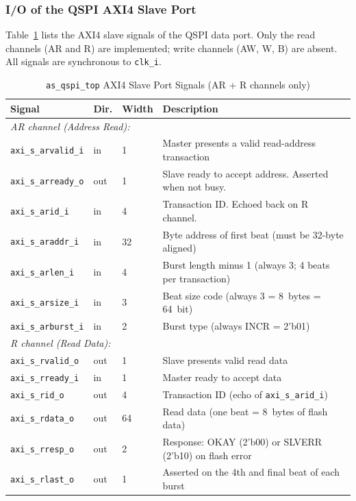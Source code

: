 \subsubsection{I/O of the QSPI AXI4 Slave Port}
\label{subsec:qspiAxi4Port}

Table~\ref{tab:asQspiAxi4} lists the AXI4 slave signals of the QSPI data port.
Only the read channels (AR and R) are implemented; write channels (AW, W, B) are absent.
All signals are synchronous to \texttt{clk\_i}.

\begin{table}[H]
\caption{\texttt{as\_qspi\_top} AXI4 Slave Port Signals (AR + R channels only)}
\label{tab:asQspiAxi4}
\centering
\begin{tabularx}{\textwidth}{|l|l|l|X|}
  \hline
  Signal & Dir. & Width & Description \\
  \hline\hline
  \multicolumn{4}{|l|}{\textit{AR channel (Address Read):}} \\
  \hline
  \texttt{axi\_s\_arvalid\_i} & in  & 1  & Master presents a valid read-address transaction \\
  \hline
  \texttt{axi\_s\_arready\_o} & out & 1  & Slave ready to accept address. Asserted when not busy. \\
  \hline
  \texttt{axi\_s\_arid\_i}    & in  & 4  & Transaction ID. Echoed back on R channel. \\
  \hline
  \texttt{axi\_s\_araddr\_i}  & in  & 32 & Byte address of first beat (must be 32-byte aligned) \\
  \hline
  \texttt{axi\_s\_arlen\_i}   & in  & 4  & Burst length minus 1 (always 3; 4 beats per transaction) \\
  \hline
  \texttt{axi\_s\_arsize\_i}  & in  & 3  & Beat size code (always 3 = 8~bytes = 64~bit) \\
  \hline
  \texttt{axi\_s\_arburst\_i} & in  & 2  & Burst type (always INCR = 2'b01) \\
  \hline
  \multicolumn{4}{|l|}{\textit{R channel (Read Data):}} \\
  \hline
  \texttt{axi\_s\_rvalid\_o}  & out & 1  & Slave presents valid read data \\
  \hline
  \texttt{axi\_s\_rready\_i}  & in  & 1  & Master ready to accept data \\
  \hline
  \texttt{axi\_s\_rid\_o}     & out & 4  & Transaction ID (echo of \texttt{axi\_s\_arid\_i}) \\
  \hline
  \texttt{axi\_s\_rdata\_o}   & out & 64 & Read data (one beat = 8~bytes of flash data) \\
  \hline
  \texttt{axi\_s\_rresp\_o}   & out & 2  & Response: OKAY (2'b00) or SLVERR (2'b10) on flash error \\
  \hline
  \texttt{axi\_s\_rlast\_o}   & out & 1  & Asserted on the 4th and final beat of each burst \\
  \hline
\end{tabularx}
\end{table}

